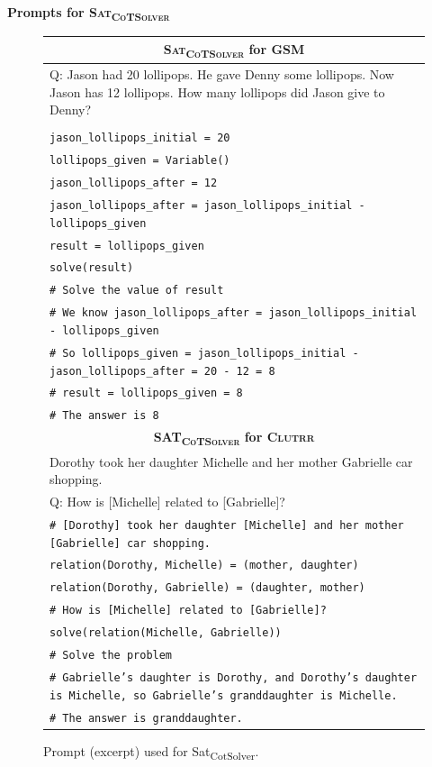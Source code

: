 \documentclass{article}
\theoremstyle{definition}
\newcommand{\gsm}{\textsc{GSM}}
\newcommand{\clutrr}{\textsc{Clutrr}}
\begin{document}
\textbf{Prompts for \textsc{Sat\textsubscript{CoTSolver}}}
\begin{figure}[h]
    \footnotesize
    \centering
    \begin{tabularx}{\linewidth}{X}
    \toprule
            \multicolumn{1}{c}{\textbf{\textsc{Sat\textsubscript{CoTSolver}} for \gsm{}} } \\
            \midrule
Q: Jason had 20 lollipops. He gave Denny some lollipops. Now Jason has 12 lollipops. How many lollipops did Jason give to Denny?\\
\\


    \tt jason\_lollipops\_initial = 20 \\
    \tt lollipops\_given = Variable() \\
    \tt jason\_lollipops\_after = 12 \\
    \tt jason\_lollipops\_after = jason\_lollipops\_initial - lollipops\_given \\
    \tt result = lollipops\_given \\
    \tt solve(result) \\
    \tt \# Solve the value of result \\
    \tt \# We know jason\_lollipops\_after = jason\_lollipops\_initial - lollipops\_given \\
    \tt \# So lollipops\_given = jason\_lollipops\_initial - jason\_lollipops\_after = 20 - 12 = 8 \\
    \tt \# result = lollipops\_given = 8 \\
    \tt \# The answer is 8 \\
         \midrule
\multicolumn{1}{c}{\textbf{\textsc{SAT\textsubscript{CoTSolver}} for \clutrr{}}} \\
\midrule

Dorothy took her daughter Michelle and her mother Gabrielle car shopping.\\
Q: How is [Michelle] related to [Gabrielle]?\\
   \tt \# [Dorothy] took her daughter [Michelle] and her mother [Gabrielle] car shopping.\\
   \tt relation(Dorothy, Michelle) = (mother, daughter)\\
   \tt relation(Dorothy, Gabrielle) = (daughter, mother)\\
    \tt \# How is [Michelle] related to [Gabrielle]?\\
   \tt solve(relation(Michelle, Gabrielle))\\
   \tt \# Solve the problem \\
    \tt \# Gabrielle's daughter is Dorothy, and Dorothy's daughter is Michelle, so Gabrielle's granddaughter is Michelle.\\
    \tt \# The answer is granddaughter.\\
         \bottomrule
    \end{tabularx}
    \caption{Prompt (excerpt) used for {\sc Sat\textsubscript{CotSolver}}. }
\end{figure}
\end{document}
